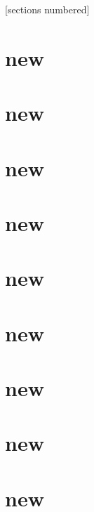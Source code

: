

\subtitle{Lecture Topics}
\author[Thüm, Kehrer, Kuiter]{Thomas Thüm, Timo Kehrer, Elias Kuiter}

[sections numbered]

\usepackage{pdfpages}
\newcommand{\addlecture}[1]{\section{#1}\begin{frame}\end{frame}}


	

\usebackgroundtemplate{}
\AtBeginSection[]{}

\addlecture{new}
\addlecture{new}
\addlecture{new}

\sectionend
	
\addlecture{new}
\addlecture{new}
\addlecture{new}

\sectionend

\addlecture{new}
\addlecture{new}
\addlecture{new}


